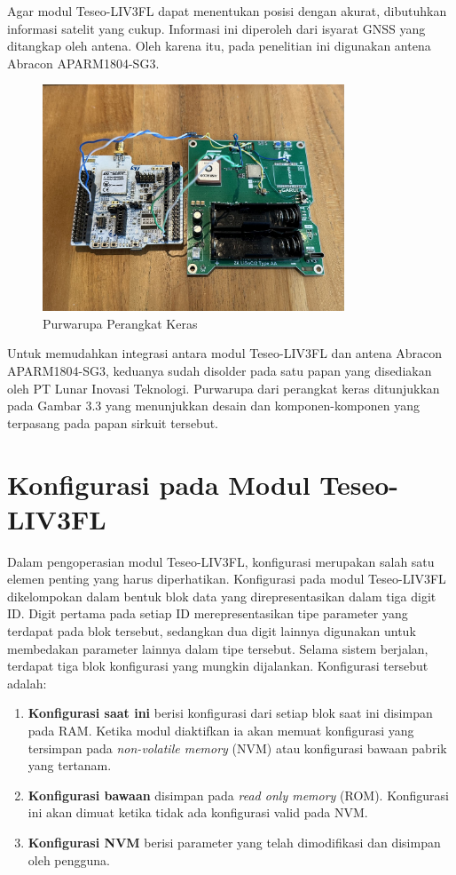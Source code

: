 Agar modul Teseo-LIV3FL dapat menentukan posisi dengan akurat, dibutuhkan informasi satelit yang cukup. Informasi ini diperoleh dari isyarat GNSS yang ditangkap oleh antena. Oleh karena itu, pada penelitian ini digunakan antena Abracon APARM1804-SG3.

\begin{figure}[H]
	\centering
	\includegraphics[width=9cm]{contents/chapter-3/purwarupa.jpg}
	\caption{Purwarupa Perangkat Keras}
	\label{Fig: purwarupa-alat}
\end{figure}

Untuk memudahkan integrasi antara modul Teseo-LIV3FL dan antena Abracon APARM1804-SG3, keduanya sudah disolder pada satu papan yang disediakan oleh PT Lunar Inovasi Teknologi. Purwarupa dari perangkat keras ditunjukkan pada Gambar 3.3 yang menunjukkan desain dan komponen-komponen yang terpasang pada papan sirkuit tersebut.

\section{Konfigurasi pada Modul Teseo-LIV3FL}
Dalam pengoperasian modul Teseo-LIV3FL, konfigurasi merupakan salah satu elemen penting yang harus diperhatikan. Konfigurasi pada modul Teseo-LIV3FL dikelompokan dalam bentuk blok data yang direpresentasikan dalam tiga digit ID. Digit pertama pada setiap ID merepresentasikan tipe parameter yang terdapat pada blok tersebut, sedangkan dua digit lainnya digunakan untuk membedakan parameter lainnya dalam tipe tersebut. Selama sistem berjalan, terdapat tiga blok konfigurasi yang mungkin dijalankan. Konfigurasi tersebut adalah:

\begin{enumerate}
	\item \textbf{Konfigurasi saat ini} berisi konfigurasi dari setiap blok saat ini disimpan pada RAM. Ketika modul diaktifkan ia akan memuat konfigurasi yang tersimpan pada \textit{non-volatile memory} (NVM) atau konfigurasi bawaan pabrik yang tertanam.
	\item \textbf{Konfigurasi bawaan} disimpan pada \textit{read only memory} (ROM). Konfigurasi ini akan dimuat ketika tidak ada konfigurasi valid pada NVM.
	\item \textbf{Konfigurasi NVM} berisi parameter yang telah dimodifikasi dan disimpan oleh pengguna.
\end{enumerate}

